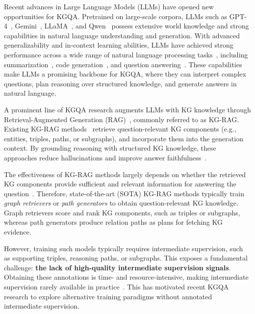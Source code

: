 \documentclass{article}
\begin{document}
Recent advances in Large Language Models (LLMs) have opened new opportunities for KGQA. Pretrained on large-scale corpora, LLMs such as GPT-4~\citep{openai_gpt4_2024}, Gemini~\citep{google_gemini_2025}, LLaMA~\citep{meta_llama_2024}, and Qwen~\citep{yang_qwen3_2025} possess extensive world knowledge and strong capabilities in natural language understanding and generation. With advanced generalizability and in-context learning abilities, LLMs have achieved strong performance across a wide range of natural language processing tasks~\citep{wei_cot_2023, wang_selfConsistency_2023}, including summarization~\citep{laban_kgsumm_2023}, code generation~\citep{lei_llmcode_2025}, and question answering~\citep{yang_hotpotqa_2018}.  These capabilities make LLMs a promising backbone for KGQA, where they can interpret complex questions, plan reasoning over structured knowledge, and generate answers in natural language.

A prominent line of KGQA research augments LLMs with KG knowledge through Retrieval-Augmented Generation (RAG)~\citep{lewis_rag_2021}, commonly referred to as KG-RAG. Existing KG-RAG methods~\citep{li_subgraphrag_2025, mavromatis_gnnrag_2025, yao_rapl_2025, luo_gcr_2025, sun_tog_2024, fang_karpa_2025, li_flexkbqa_2024} retrieve question-relevant KG components (e.g., entities, triples, paths, or subgraphs), and incorporate them into the generation context. By grounding reasoning with structured KG knowledge, these approaches reduce hallucinations and improve answer faithfulness~\citep{pan_unifyingSurvey_2024}.

The effectiveness of KG-RAG methods largely depends on whether the retrieved KG components provide sufficient and relevant information for answering the question~\citep{li_subgraphrag_2025, luo_gcr_2025}.
Therefore, state-of-the-art (SOTA) KG-RAG methods typically train \emph{graph retrievers} or \emph{path generators} to obtain question-relevant KG knowledge.
Graph retrievers score and rank KG components, such as triples or subgraphs, whereas path generators produce relation paths as plans for fetching KG evidence.

However, training such models typically requires intermediate supervision, such as supporting triples, reasoning paths, or subgraphs.
This exposes a fundamental challenge: \textbf{the lack of high-quality intermediate supervision signals}.
Obtaining these annotations is time- and resource-intensive, making intermediate supervision rarely available in practice~\citep{gu_beyond_2021, li_flexkbqa_2024, li_kbBinder_2023}. This has motivated recent KGQA research to explore alternative training paradigms without annotated intermediate supervision.
\end{document}
